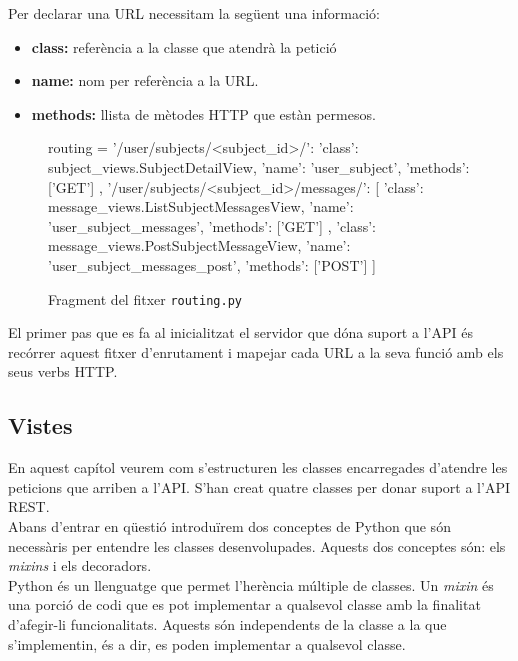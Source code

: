 Per declarar una \ac{URL} necessitam la següent una informació:

\begin{itemize}
	\item \textbf{class:} referència a la classe que atendrà la petició
	\item \textbf{name:} nom per referència a la \ac{URL}.
	\item \textbf{methods:} llista de mètodes \ac{HTTP} que estàn permesos.
\end{itemize}

\begin{figure}[h!]
	\begin{python}
routing = {
	'/user/subjects/<subject_id>/': {
		'class': subject_views.SubjectDetailView,
		'name': 'user_subject',
		'methods': ['GET']
	},
	'/user/subjects/<subject_id>/messages/': [
		{
			'class': message_views.ListSubjectMessagesView,
			'name': 'user_subject_messages',
			'methods': ['GET']
		},
		{
			'class': message_views.PostSubjectMessageView,
			'name': 'user_subject_messages_post',
			'methods': ['POST']
		}
	]
}
	\end{python}
	\label{fig:routing}
	\caption{Fragment del fitxer \texttt{routing.py}}
\end{figure}

El primer pas que es fa al inicialitzat el servidor que dóna suport a l'\ac{API} és recórrer aquest fitxer d'enrutament i mapejar cada \ac{URL} a la seva funció amb els seus verbs \ac{HTTP}.

\subsection{Vistes}
En aquest capítol veurem com s'estructuren les classes encarregades d'atendre les peticions que arriben a l'\ac{API}. S'han creat quatre classes per donar suport a l'\ac{API} \ac{REST}. \\

Abans d'entrar en qüestió introduïrem dos conceptes de Python que són necessàris per entendre les classes desenvolupades. Aquests dos conceptes són: els \emph{mixins} i els decoradors.\\

Python és un llenguatge que permet l'herència múltiple de classes. Un \emph{mixin} és una porció de codi que es pot implementar a qualsevol classe amb la finalitat d'afegir-li funcionalitats. Aquests són independents de la classe a la que s'implementin, és a dir, es poden implementar a qualsevol classe.\\

